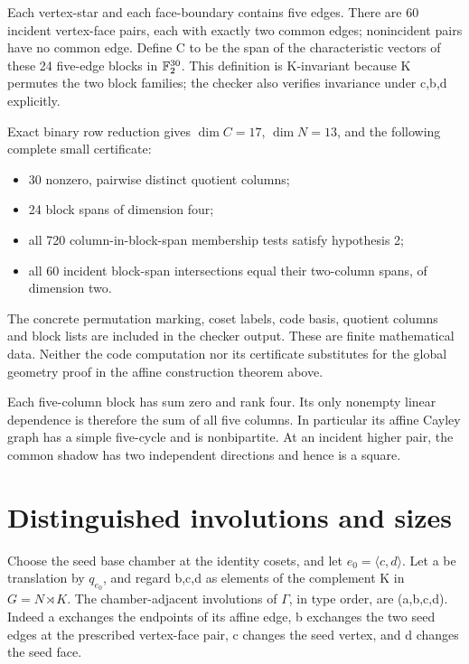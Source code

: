 Each vertex-star and each face-boundary contains five edges. There are
60 incident vertex-face pairs, each with exactly two common edges;
nonincident pairs have no common edge. Define C to be the span of the
characteristic vectors of these 24 five-edge blocks in \(\mathbb F_2^{30}\).
This definition is K-invariant because K permutes the two block
families; the checker also verifies invariance under c,b,d explicitly.

Exact binary row reduction gives \(\dim C=17\), \(\dim N=13\), and the following
complete small certificate:

\begin{itemize}
\tightlist
\item
  30 nonzero, pairwise distinct quotient columns;
\item
  24 block spans of dimension four;
\item
  all 720 column-in-block-span membership tests satisfy hypothesis 2;
\item
  all 60 incident block-span intersections equal their two-column spans,
  of dimension two.
\end{itemize}

The concrete permutation marking, coset labels, code basis, quotient
columns and block lists are included in the checker output. These are
finite mathematical data. Neither the code computation nor its
certificate substitutes for the global geometry proof in the affine
construction theorem above.

Each five-column block has sum zero and rank four. Its only nonempty
linear dependence is therefore the sum of all five columns. In
particular its affine Cayley graph has a simple five-cycle and is
nonbipartite. At an incident higher pair, the common shadow has two
independent directions and hence is a square.

\section{Distinguished involutions and
sizes}\label{distinguished-involutions-and-sizes}

Choose the seed base chamber at the identity cosets, and let
\(e_0=\langle c,d\rangle\). Let a be translation by \(q_{e_0}\), and
regard b,c,d as elements of the complement K in \(G=N\rtimes K\). The
chamber-adjacent involutions of \(\Gamma\), in type order, are
(a,b,c,d). Indeed a exchanges the endpoints of its affine edge, b
exchanges the two seed edges at the prescribed vertex-face pair, c
changes the seed vertex, and d changes the seed face.

